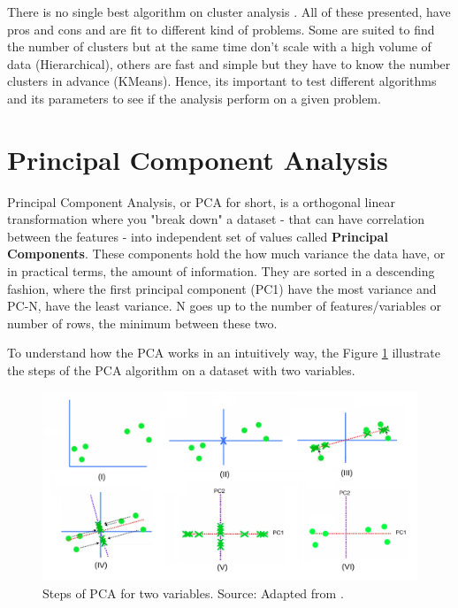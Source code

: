 There is no single best algorithm on cluster analysis \cite{james2013introduction}. All of these presented, have pros and cons and are fit to different kind of problems. Some are suited to find the number of clusters but at the same time don't scale with a high volume of data (Hierarchical), others are fast and simple but they have to know the number clusters in advance (KMeans). Hence, its important to test different algorithms and its parameters to see if the analysis perform on a given problem.

\section{Principal Component Analysis}

Principal Component Analysis, or PCA for short, is a orthogonal linear transformation \cite{wikipedia_pca} where you "break down" a dataset - that can have correlation between the features - into independent set of values called \textbf{Principal Components}. These components hold the how much variance the data have, or in practical terms, the amount of information. They are sorted in a descending fashion, where the first principal component (PC1) have the most variance and PC-N, have the least variance. N goes up to the number of features/variables or number of rows, the minimum between these two. 

To understand how the PCA works in an intuitively way, the Figure \ref{fig:pca-steps} illustrate the steps of the PCA algorithm on a dataset with two variables.

\begin{figure}[h]
   \centering
   \includegraphics[width=\linewidth]{fig/ch2-pca-steps.png}
   \caption{Steps of PCA for two variables. Source: Adapted from \cite{pcastepsyoutube}.}
   \label{fig:pca-steps}
\end{figure}

